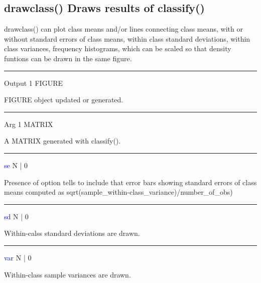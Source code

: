 \subsection{\textcolor{VioletRed}{drawclass}() Draws results of \textcolor{VioletRed}{classify}()}
\label{drawclass}
\textcolor{VioletRed}{drawclass}() can plot class means and/or lines connecting class means, with
or without standard errors of class means, within class standard deviations,
within class variances, frequency histograms, which can be scaled so that
density funtions can be drawn in the same figure.
\vspace{0.3cm}
\hrule
\vspace{0.3cm}
\noindent Output  \tabto{3cm} 1  \tabto{5cm}   FIGURE  \tabto{7cm}
\begin{changemargin}{3cm}{0cm}
\noindent  FIGURE object updated or generated.
\end{changemargin}
\vspace{0.3cm}
\hrule
\vspace{0.3cm}
\noindent Arg  \tabto{3cm}  1 \tabto{5cm}   MATRIX  \tabto{7cm}
\begin{changemargin}{3cm}{0cm}
\noindent  A MATRIX generated with \textcolor{VioletRed}{classify}().
\end{changemargin}
\vspace{0.3cm}
\hrule
\vspace{0.3cm}
\noindent \textcolor{blue}{se}  \tabto{3cm}  N | 0  \tabto{5cm}    \tabto{7cm}
\begin{changemargin}{3cm}{0cm}
\noindent Presence of option tells to include that error bars showing standard errors
of class means computed as \textcolor{VioletRed}{sqrt}(sample\_within-class\_variance)/number\_of\_obs)
\end{changemargin}
\vspace{0.3cm}
\hrule
\vspace{0.3cm}
\noindent \textcolor{blue}{sd}  \tabto{3cm}  N | 0  \tabto{5cm}    \tabto{7cm}
\begin{changemargin}{3cm}{0cm}
\noindent  Within-calss standard deviations are drawn.
\end{changemargin}
\vspace{0.3cm}
\hrule
\vspace{0.3cm}
\noindent \textcolor{blue}{var}  \tabto{3cm}  N | 0  \tabto{5cm}     \tabto{7cm}
\begin{changemargin}{3cm}{0cm}
\noindent Within-class sample variances are drawn.
\end{changemargin}
